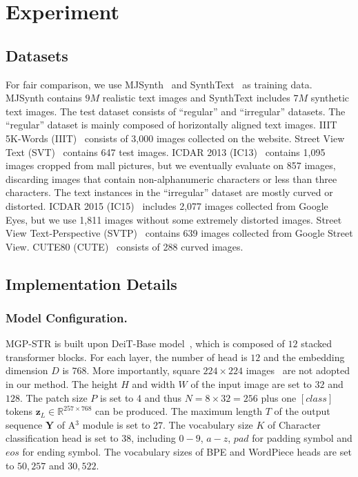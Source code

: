 \documentclass[runningheads]{llncs}
\begin{document}
\section{Experiment}
\label{Sec:Experiment}
\subsection{ Datasets}

For fair comparison, we use MJSynth~\cite{MJ1,MJ2} and SynthText~\cite{ST} as training data. MJSynth contains $9M$ realistic text images and SynthText includes $7M$ synthetic text images. The test dataset consists of ``regular'' and ``irregular'' datasets. The ``regular'' dataset is mainly composed of horizontally aligned text images. IIIT 5K-Words (IIIT)~\cite{IIIT} consists of 3,000 images collected on the website. Street View Text (SVT)~\cite{SVT} contains 647 test images. ICDAR 2013 (IC13)~\cite{IC13} contains 1,095 images cropped from mall pictures, but we eventually evaluate on 857 images, discarding images that contain non-alphanumeric characters or less than three characters. The text instances in the ``irregular'' dataset are mostly curved or distorted. ICDAR 2015 (IC15)~\cite{IC15} includes 2,077 images collected from Google Eyes, but we use 1,811 images without some extremely distorted images. Street View Text-Perspective (SVTP)~\cite{SVTP} contains 639 images collected from Google Street View. CUTE80 (CUTE)~\cite{CUTE} consists of 288 curved images.







\subsection{Implementation Details}

\subsubsection{Model Configuration.} 
MGP-STR is built upon DeiT-Base model~\cite{deit}, which is composed of $12$ stacked transformer blocks.
For each layer, the number of head is $12$ and the embedding dimension $D$ is $768$. 
More importantly, square $ 224 \times 224$ images~\cite{dosovitskiy2020image,deit,ViTSTR} are not adopted in our method.
The height $H$ and width $W$ of the input image are set to $32$ and $128$.
The patch size $P$ is set to 4 and thus $N=8 \times 32 =256$ plus one $[class]$ tokens $\mathbf{z}_L \in \mathbb{R}^{257\times768}$ can be produced.
The maximum length $T$ of the output sequence $\mathbf{Y}$ of A$^3$ module is set to $27$. 
The vocabulary size $K$ of Character classification head is set to 38, including $0-9$, $a-z$, $pad$ for padding symbol and $eos$ for ending symbol.
The vocabulary sizes of BPE and WordPiece heads are set to $50,257$ and $30,522$.
\end{document}
